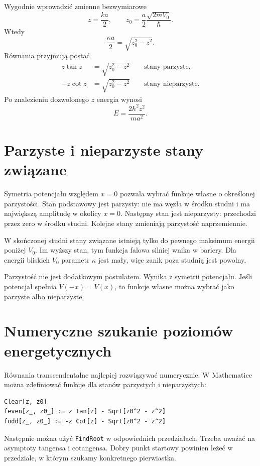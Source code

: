 Wygodnie wprowadzić zmienne bezwymiarowe
\begin{equation}
    z=\frac{ka}{2},
    \qquad
    z_0=\frac{a}{2}\frac{\sqrt{2mV_0}}{\hbar}.
\end{equation}
Wtedy
\begin{equation}
    \frac{\kappa a}{2}=\sqrt{z_0^2-z^2}.
\end{equation}
Równania przyjmują postać
\begin{align}
    z\tan z &= \sqrt{z_0^2-z^2} \qquad \text{stany parzyste},\\
    -z\cot z &= \sqrt{z_0^2-z^2} \qquad \text{stany nieparzyste}.
\end{align}
Po znalezieniu dozwolonego \(z\) energia wynosi
\begin{equation}
    E=\frac{2\hbar^2 z^2}{ma^2}.
\end{equation}

\section{Parzyste i nieparzyste stany związane}

Symetria potencjału względem \(x=0\) pozwala wybrać funkcje własne o określonej parzystości. Stan podstawowy jest parzysty: nie ma węzła w środku studni i ma największą amplitudę w okolicy \(x=0\). Następny stan jest nieparzysty: przechodzi przez zero w środku studni. Kolejne stany zmieniają parzystość naprzemiennie.

W skończonej studni stany związane istnieją tylko do pewnego maksimum energii poniżej \(V_0\). Im wyższy stan, tym funkcja falowa silniej wnika w bariery. Dla energii bliskich \(V_0\) parametr \(\kappa\) jest mały, więc zanik poza studnią jest powolny.

\begin{remarkbox}
Parzystość nie jest dodatkowym postulatem. Wynika z symetrii potencjału. Jeśli potencjał spełnia \(V(-x)=V(x)\), to funkcje własne można wybrać jako parzyste albo nieparzyste.
\end{remarkbox}

\section{Numeryczne szukanie poziomów energetycznych}

Równania transcendentalne najlepiej rozwiązywać numerycznie. W Mathematice można zdefiniować funkcje dla stanów parzystych i nieparzystych:
\begin{verbatim}
Clear[z, z0]
feven[z_, z0_] := z Tan[z] - Sqrt[z0^2 - z^2]
fodd[z_, z0_] := -z Cot[z] - Sqrt[z0^2 - z^2]
\end{verbatim}
Następnie można użyć \texttt{FindRoot} w odpowiednich przedziałach. Trzeba uważać na asymptoty tangensa i cotangensa. Dobry punkt startowy powinien leżeć w przedziale, w którym szukamy konkretnego pierwiastka.


